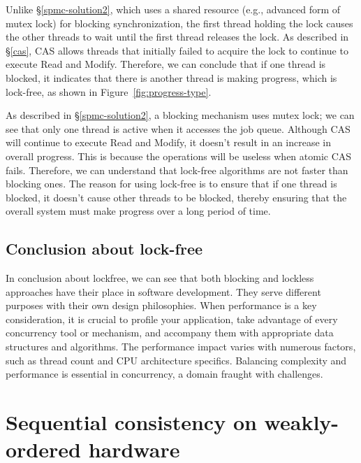 \documentclass[fontsize=10pt, oneside]{scrartcl}
\newcommand{\fig}[1]{Figure~\ref{#1}}
\newcommand{\secref}[1]{\hyperref[#1]{\textsc{\S}\ref*{#1}}}
\begin{document}
Unlike \secref{spmc-solution2}, 
which uses a shared resource (e.g., advanced form of mutex lock) for blocking synchronization, 
the first thread holding the lock causes the other threads to wait until the first thread releases the lock. 
As described in \secref{cas}, \textsc{CAS} allows threads that initially failed to acquire the lock to continue to execute Read and Modify. 
Therefore, we can conclude that if one thread is blocked, 
it indicates that there is another thread is making progress, 
which is lock-free, as shown in \fig{fig:progress-type}.

As described in \secref{spmc-solution2}, a blocking mechanism uses mutex lock; 
we can see that only one thread is active when it accesses the job queue. 
Although \textsc{CAS} will continue to execute Read and Modify, 
it doesn't result in an increase in overall progress. 
This is because the operations will be useless when atomic \textsc{CAS} fails. 
Therefore, we can understand that lock-free algorithms are not faster than blocking ones. 
The reason for using lock-free is to ensure that if one thread is blocked, 
it doesn't cause other threads to be blocked, 
thereby ensuring that the overall system must make progress over a long period of time.

\subsection{Conclusion about lock-free}
In conclusion about lockfree, 
we can see that both blocking and lockless approaches have their place in software development. 
They serve different purposes with their own design philosophies. 
When performance is a key consideration, it is crucial to profile your application, 
take advantage of every concurrency tool or mechanism, and accompany them with appropriate data structures and algorithms. 
The performance impact varies with numerous factors, such as thread count and CPU architecture specifics. 
Balancing complexity and performance is essential in concurrency, 
a domain fraught with challenges.

\section{Sequential consistency on weakly-ordered hardware}
\end{document}
